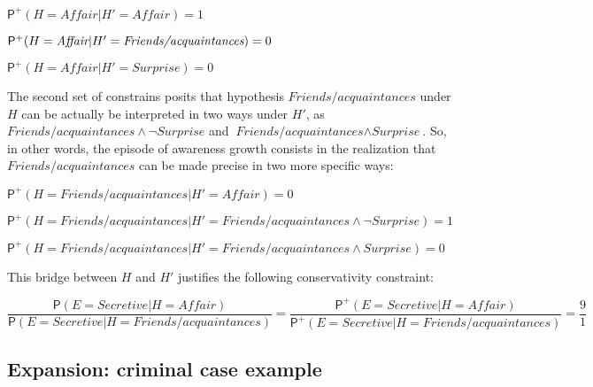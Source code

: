 \documentclass[
  11pt,
  dvipsnames,enabledeprecatedfontcommands]{scrartcl}
\newcommand{\pr}[1]{\ensuremath{\mathsf{P}(#1)}}
\newcommand{\ppr}[2]{\ensuremath{\mathsf{P}^{#1}(#2)}}
\begin{document}
\(\ppr{+}{H=\textit{Affair} \vert H'=\textit{Affair}}=1\)

\(\ppr{+}{H=\textit{Affair} \vert H'=\textit{\textit{Friends/acquaintances}}}=0\)

\(\ppr{+}{H=\textit{Affair} \vert H'=\textit{Surprise}}=0\)

The second set of constrains posits that hypothesis
\(\textit{Friends/acquaintances}\) under \(H\) can be actually be
interpreted in two ways under \(H'\), as
\(\textit{Friends/acquaintances} \wedge \neg \textit{Surprise}\) and
\(\textit{Friends/acquaintances} \wedge \textit{Surprise}\). So, in
other words, the episode of awareness growth consists in the realization
that \(\textit{Friends/acquaintances}\) can be made precise in two more
specific ways:

\(\ppr{+}{H=\textit{Friends/acquaintances} \vert H'=\textit{Affair}}=0\)

\(\ppr{+}{H=\textit{Friends/acquaintances} \vert H'=\textit{Friends/acquaintances} \wedge \neg \textit{Surprise}}=1\)

\(\ppr{+}{H=\textit{Friends/acquaintances} \vert H'=\textit{Friends/acquaintances} \wedge \textit{Surprise}}=0\)

This bridge between \(H\) and \(H'\) justifies the following
conservativity constraint:

\[\frac{\pr{E=\textit{Secretive}\vert H=\textit{Affair}}}{\pr{E=\textit{Secretive}\vert H=\textit{Friends/acquaintances}}} = \frac{\ppr{+}{E=\textit{Secretive}\vert H=\textit{Affair}}}{\ppr{+}{E=\textit{Secretive}\vert H=\textit{Friends/acquaintances}}}=\frac{9}{1} \]

\hypertarget{expansion-criminal-case-example}{%
\subsection{Expansion: criminal case
example}\label{expansion-criminal-case-example}}
\end{document}
